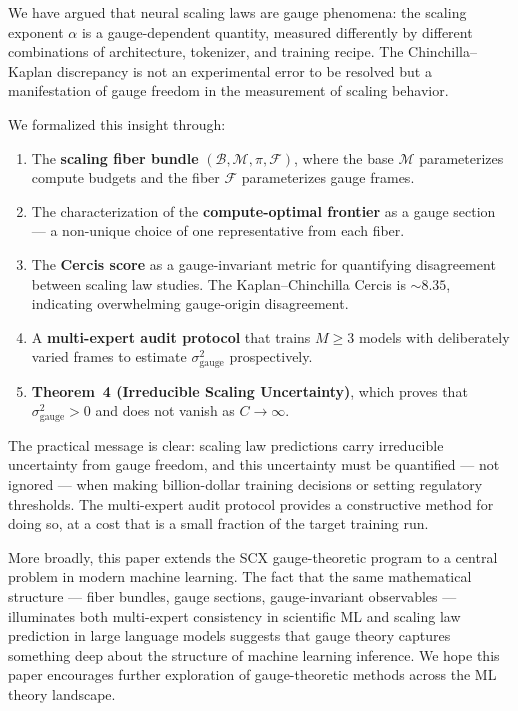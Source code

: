 \documentclass[12pt,a4paper]{article}
\theoremstyle{remark}
\begin{document}
We have argued that neural scaling laws are gauge phenomena: the scaling exponent $\alpha$ is a gauge-dependent quantity, measured differently by different combinations of architecture, tokenizer, and training recipe. The Chinchilla--Kaplan discrepancy is not an experimental error to be resolved but a manifestation of gauge freedom in the measurement of scaling behavior.

We formalized this insight through:

\begin{enumerate}[label=(\arabic*), leftmargin=*]
    \item The \textbf{scaling fiber bundle} $(\mathcal{B}, \mathcal{M}, \pi, \mathcal{F})$, where the base $\mathcal{M}$ parameterizes compute budgets and the fiber $\mathcal{F}$ parameterizes gauge frames.
    \item The characterization of the \textbf{compute-optimal frontier} as a gauge section — a non-unique choice of one representative from each fiber.
    \item The \textbf{Cercis score} as a gauge-invariant metric for quantifying disagreement between scaling law studies. The Kaplan--Chinchilla Cercis is $\sim 8.35$, indicating overwhelming gauge-origin disagreement.
    \item A \textbf{multi-expert audit protocol} that trains $M \geq 3$ models with deliberately varied frames to estimate $\sigma^2_{\text{gauge}}$ prospectively.
    \item \textbf{Theorem~4 (Irreducible Scaling Uncertainty)}, which proves that $\sigma^2_{\text{gauge}} > 0$ and does not vanish as $C \to \infty$.
\end{enumerate}

The practical message is clear: scaling law predictions carry irreducible uncertainty from gauge freedom, and this uncertainty must be quantified — not ignored — when making billion-dollar training decisions or setting regulatory thresholds. The multi-expert audit protocol provides a constructive method for doing so, at a cost that is a small fraction of the target training run.

More broadly, this paper extends the SCX gauge-theoretic program to a central problem in modern machine learning. The fact that the same mathematical structure — fiber bundles, gauge sections, gauge-invariant observables — illuminates both multi-expert consistency in scientific ML and scaling law prediction in large language models suggests that gauge theory captures something deep about the structure of machine learning inference. We hope this paper encourages further exploration of gauge-theoretic methods across the ML theory landscape.
\end{document}
